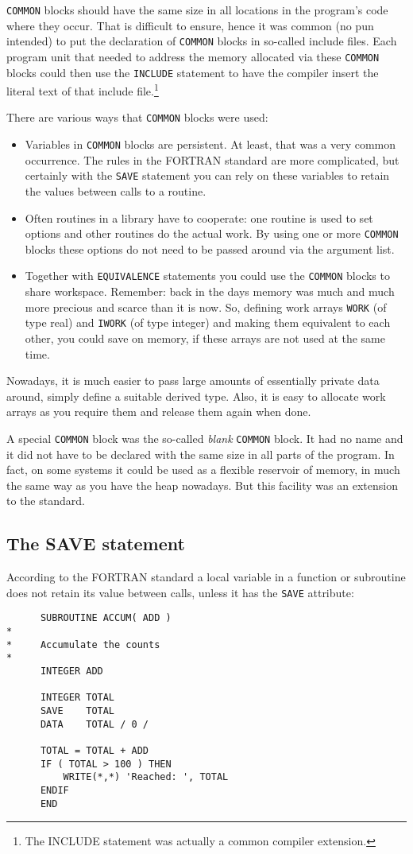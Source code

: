 \verb+COMMON+ blocks should have the same size in all locations in the program's
code where they occur. That is difficult to ensure, hence it was common (no pun intended)
to put the declaration of \verb+COMMON+ blocks in so-called include files. Each program
unit that needed to address the memory allocated via these \verb+COMMON+ blocks could
then use the \verb+INCLUDE+ statement to have the compiler insert the literal text
of that include file.\footnote{The INCLUDE statement was actually a common compiler
extension.}

There are various ways that \verb+COMMON+ blocks were used:
\begin{itemize}
\item
Variables in \verb+COMMON+ blocks are persistent. At least, that was a very common
occurrence. The rules in the FORTRAN standard are more complicated, but certainly
with the \verb+SAVE+ statement you can rely on these variables to retain the
values between calls to a routine.
\item
Often routines in a library have to cooperate: one routine is used to set options
and other routines do the actual work. By using one or more \verb+COMMON+ blocks
these options do not need to be passed around via the argument list.
\item
Together with \verb+EQUIVALENCE+ statements you could use the \verb+COMMON+ blocks
to share workspace. Remember: back in the days memory was much and much more precious
and scarce than it is now. So, defining work arrays \verb+WORK+ (of type real)
and \verb+IWORK+ (of type integer) and making them equivalent to each other, you
could save on memory, if these arrays are not used at the same time.
\end{itemize}
Nowadays, it is much easier to pass large amounts of essentially private data
around, simply define a suitable derived type. Also, it is easy to allocate
work arrays as you require them and release them again when done.

A special \verb+COMMON+ block was the so-called \emph{blank} \verb+COMMON+
block. It had no name and it did not have to be declared with the same size
in all parts of the program. In fact, on some systems it could be used as
a flexible reservoir of memory, in much the same way as you have the
heap nowadays. But this facility was an extension to the standard.


\subsection{The SAVE statement}
According to the FORTRAN standard a local variable in a function or
subroutine does not retain its value between calls, unless it has the
\verb+SAVE+ attribute:
%
\begin{verbatim}
      SUBROUTINE ACCUM( ADD )
*
*     Accumulate the counts
*
      INTEGER ADD

      INTEGER TOTAL
      SAVE    TOTAL
      DATA    TOTAL / 0 /

      TOTAL = TOTAL + ADD
      IF ( TOTAL > 100 ) THEN
          WRITE(*,*) 'Reached: ', TOTAL
      ENDIF
      END
\end{verbatim}

